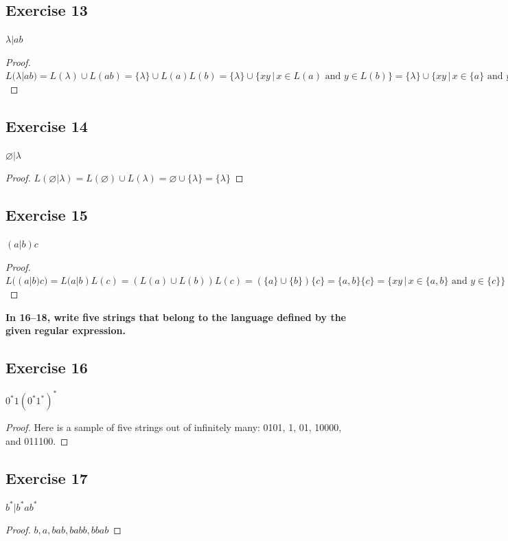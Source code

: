 \documentclass[14pt]{extarticle}
\newcommand{\es}{\varnothing}
\newcommand{\cy}{\color{cyan}}
\begin{document}
\subsection{Exercise 13}
\(\lambda | ab\)

\begin{proof}
    \(L(\lambda | ab) = L(\lambda) \cup L(ab) = \{\lambda\} \cup L(a)L(b) = \{\lambda\} \cup \{xy \,|\, x \in L(a) \text{ and }
    y \in L(b)\} = \{\lambda\} \cup \{xy \,|\, x \in \{a\} \text{ and } y \in \{b\}\} = \{\lambda\} \cup \{ab\} =
    \{\lambda, ab\}\)
\end{proof}

\subsection{Exercise 14}
\(\es | \lambda\)

\begin{proof}
    \(L(\es | \lambda) = L(\es) \cup L(\lambda) = \es \cup \{\lambda\} = \{\lambda\}\)
\end{proof}

\subsection{Exercise 15}
\((a | b)c\)

\begin{proof}
    \(L((a | b)c) = L(a|b)L(c) = (L(a) \cup L(b))L(c) = (\{a\} \cup \{b\})\{c\} = \{a,b\}\{c\} = \{xy \, | \, x \in \{a,b\}
    \text{ and } y \in \{c\}\} = \{ac, bc\}\)
\end{proof}

{\bf \cy In 16–18, write five strings that belong to the language defined by the given regular expression.}

\subsection{Exercise 16}
\(0^*1(0^*1^*)^*\)

\begin{proof}
    Here is a sample of five strings out of infinitely many: 0101, 1, 01, 10000, and 011100.
\end{proof}

\subsection{Exercise 17}
\(b^* | b^*ab^*\)

\begin{proof}
    \(b, a, bab, babb, bbab\)
\end{proof}
\end{document}
